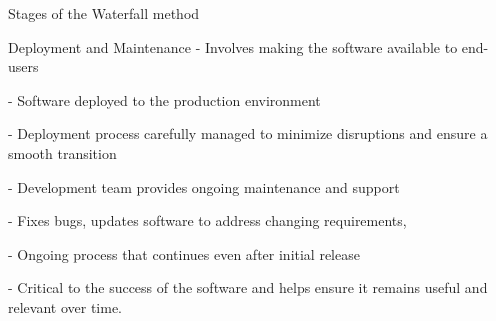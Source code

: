\begin{frame}{Stages of the Waterfall method}
    \begin{block}{Deployment and Maintenance}
        - Involves making the software available to end-users 
        
        - Software deployed to the production environment
        
        - Deployment process carefully managed to minimize disruptions and ensure a smooth transition
        
        - Development team provides ongoing maintenance and support
        
        - Fixes bugs, updates software to address changing requirements,
        
        - Ongoing process that continues even after initial release
        
        - Critical to the success of the software and helps ensure it remains useful and relevant over time.
    \end{block}   

\end{frame}